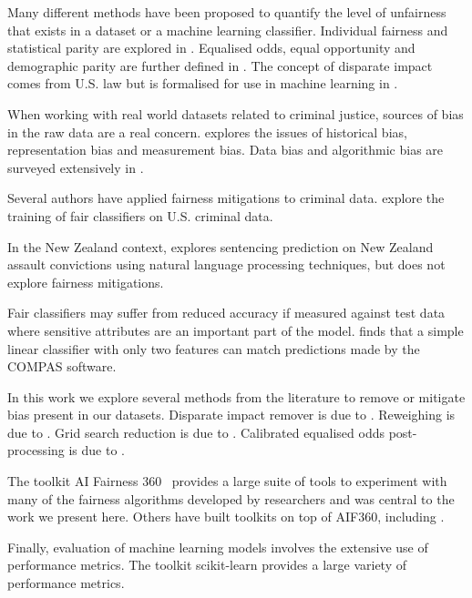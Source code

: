 \documentclass[runningheads]{llncs}
\begin{document}
Many different methods have been proposed to quantify the level of
unfairness that exists in a dataset or a machine learning classifier.
Individual fairness and statistical parity are explored in
\cite{dwork2012fairness}. Equalised odds, equal opportunity and
demographic parity are further defined in \cite{hardt2016equality}.
The concept of disparate impact comes from U.S. law but is formalised
for use in machine learning in \cite{feldman2015certifying}.

When working with real world datasets related to criminal justice,
sources of bias in the raw data are a real concern.
\cite{suresh2019framework} explores the issues of historical bias,
representation bias and measurement bias. Data bias and algorithmic
bias are surveyed extensively in \cite{mehrabi2021survey}.

Several authors have applied fairness mitigations to criminal data.
\cite{corbett2017algorithmic,zafar2017fairness} explore the training
of fair classifiers on U.S. criminal data.

In the New Zealand context, \cite{rodger2023explainable} explores
sentencing prediction on New Zealand assault convictions using natural
language processing techniques, but does not explore fairness
mitigations.

Fair classifiers may suffer from reduced accuracy if measured against
test data where sensitive attributes are an important part of the
model. \cite{dressel2018accuracy} finds that a simple linear
classifier with only two features can match predictions made by the
COMPAS software.

In this work we explore several methods from the literature to remove
or mitigate bias present in our datasets. Disparate impact remover is
due to \cite{feldman2015certifying}. Reweighing is due to
\cite{kamiran2012data}. Grid search reduction is due to
\cite{agarwal2018reductions}. Calibrated equalised odds
post-processing is due to \cite{chouldechova2017fair}.

The toolkit AI Fairness 360~\cite{bellamy2018ai} provides a large
suite of tools to experiment with many of the fairness algorithms
developed by researchers and was central to the work we present here.
Others have built toolkits on top of AIF360, including
\cite{johnson2022fairkit}.

Finally, evaluation of machine learning models involves the extensive
use of performance metrics. The toolkit scikit-learn
\cite{scikit-learn} provides a large variety of performance metrics.
\end{document}

